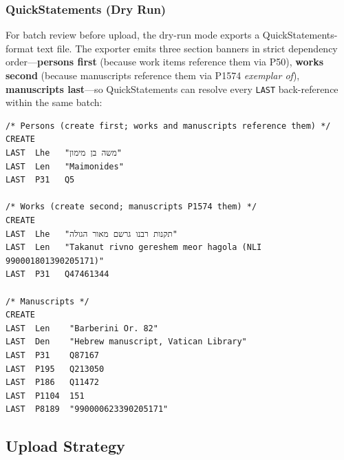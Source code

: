 \documentclass[12pt]{article}
\newcommand{\code}[1]{\texttt{#1}}
\begin{document}
\subsubsection{QuickStatements (Dry Run)}

For batch review before upload, the dry-run mode exports a QuickStatements-format text file. The exporter emits three section banners in strict dependency order---\textbf{persons first} (because work items reference them via P50), \textbf{works second} (because manuscripts reference them via P1574 \textit{exemplar of}), \textbf{manuscripts last}---so QuickStatements can resolve every \code{LAST} back-reference within the same batch:

\begin{lstlisting}[basicstyle=\ttfamily\small, frame=single]
/* Persons (create first; works and manuscripts reference them) */
CREATE
LAST  Lhe   "משה בן מימון"
LAST  Len   "Maimonides"
LAST  P31   Q5

/* Works (create second; manuscripts P1574 them) */
CREATE
LAST  Lhe   "תקנות רבנו גרשם מאור הגולה"
LAST  Len   "Takanut rivno gereshem meor hagola (NLI 990001801390205171)"
LAST  P31   Q47461344

/* Manuscripts */
CREATE
LAST  Len    "Barberini Or. 82"
LAST  Den    "Hebrew manuscript, Vatican Library"
LAST  P31    Q87167
LAST  P195   Q213050
LAST  P186   Q11472
LAST  P1104  151
LAST  P8189  "990000623390205171"
\end{lstlisting}

\subsection{Upload Strategy}
\end{document}
